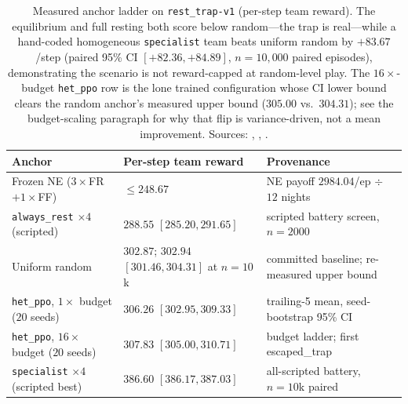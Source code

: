 \documentclass{anvil-paper}
\begin{document}
\begin{table}[h]
  \centering
  \small
  \setlength{\tabcolsep}{4pt}
  \begin{tabular}{@{}l l >{\raggedright\arraybackslash}p{1.55in}@{}}
    \toprule
    Anchor & Per-step team reward & Provenance \\
    \midrule
    Frozen NE ($3{\times}$FR$+1{\times}$FF) & $\leq 248.67$
      & NE payoff $2984.04$/ep $\div$ $12$ nights \\
    \texttt{always\_rest} $\times 4$ (scripted) & $288.55$ $[285.20, 291.65]$
      & scripted battery screen, $n{=}2000$ \\
    Uniform random & $302.87$; $302.94$ $[301.46, 304.31]$ at $n{=}10$k
      & committed baseline; re-measured upper bound \\
    \texttt{het\_ppo}, $1{\times}$ budget ($20$ seeds) & $306.26$ $[302.95, 309.33]$
      & trailing-5 mean, seed-bootstrap 95\% CI \\
    \texttt{het\_ppo}, $16{\times}$ budget ($20$ seeds) & $307.83$ $[305.00, 310.71]$
      & budget ladder; first \textsf{escaped\_trap} \\
    \texttt{specialist} $\times 4$ (scripted best) & $\mathbf{386.60}$ $[386.17, 387.03]$
      & all-scripted battery, $n{=}10$k paired \\
    \bottomrule
  \end{tabular}
  \caption{Measured anchor ladder on \texttt{rest\_trap-v1} (per-step
  team reward). The equilibrium and full resting both score below
  random---the trap is real---while a hand-coded homogeneous
  \texttt{specialist} team beats uniform random by $+83.67$/step
  (paired 95\% CI $[+82.36, +84.89]$, $n{=}10{,}000$ paired episodes),
  demonstrating the scenario is not reward-capped at random-level play.
  The $16{\times}$-budget \texttt{het\_ppo} row is the lone trained
  configuration whose CI lower bound clears the random anchor's
  measured upper bound ($305.00$ vs.\ $304.31$); see the budget-scaling
  paragraph for why that flip is variance-driven, not a mean
  improvement. Sources:
  \pathTrapBattery,
  \pathTierOneVerdict,
  \pathTrapEscape.}
  \label{tab:trap-anchors}
\end{table}
\end{document}
